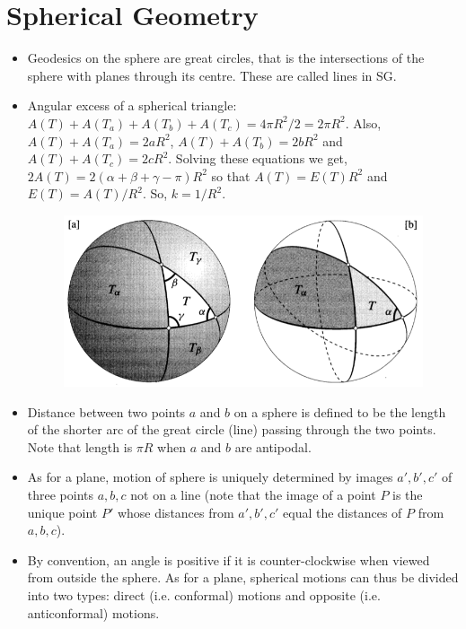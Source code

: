 \documentclass[12pt]{article}
\begin{document}
\section{Spherical Geometry}
\begin{itemize}
    \item Geodesics on the sphere are great circles, that is the intersections of the sphere with planes through its centre. These are called lines in SG.

    \item Angular excess of a spherical triangle: $A(T) + A(T_a) + A(T_b) + A(T_c) = 4\pi R^2/2 = 2\pi R^2$. Also, $A(T) + A(T_a) = 2aR^2$, $A(T) + A(T_b) = 2bR^2$ and $A(T) + A(T_c) = 2cR^2$. Solving these equations we get, $2A(T) = 2(\alpha+\beta+\gamma-\pi)R^2$ so that $A(T) = E(T)R^2$ and $E(T) = A(T)/R^2$. So, $k=1/R^2$.

    \begin{figure}[h!]
        \centering
        \includegraphics[scale=0.7]{fig_3}
        \label{fig_3}
    \end{figure}

    \item Distance between two points $a$ and $b$ on a sphere is defined to be the length of the shorter arc of the great circle (line) passing through the two points. Note that length is $\pi R$ when $a$ and $b$ are antipodal.
    
    \item As for a plane, motion of sphere is uniquely determined by images $a',b',c'$ of three points $a,b,c$ not on a line (note that the image of a point $P$ is the unique point $P'$ whose distances from $a',b',c'$ equal the distances of $P$ from $a,b,c$).
    
    \item By convention, an angle is positive if it is counter-clockwise when viewed from outside the sphere. As for a plane, spherical motions can thus be divided into two types: direct (i.e. conformal) motions and opposite (i.e. anticonformal) motions.
    

\end{itemize}
\end{document}
